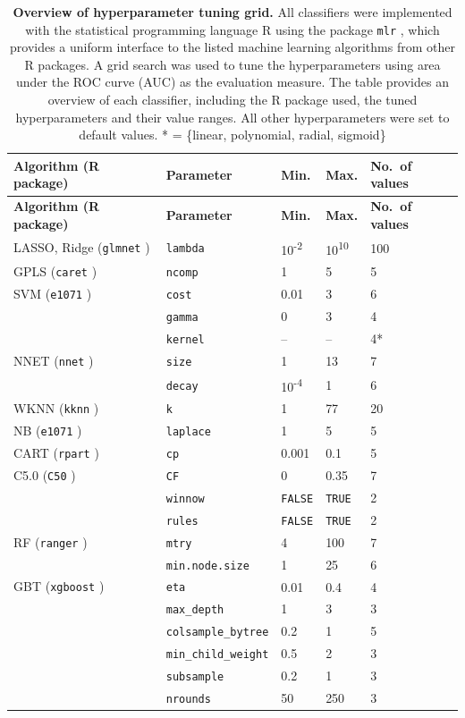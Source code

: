\documentclass[
  oneside]{book}
\begin{document}
\begin{longtable}[]{@{}lllll@{}}
\caption{\label{tab:09-hyper-tab}\textbf{Overview of hyperparameter tuning grid.} All classifiers were implemented with the statistical programming language R \autocite{rlanguage} using the package \texttt{mlr} \autocite{Bischl:mlr2016}, which provides a uniform interface to the listed machine learning algorithms from other R packages. A grid search was used to tune the hyperparameters using area under the ROC curve (AUC) as the evaluation measure. The table provides an overview of each classifier, including the R package used, the tuned hyperparameters and their value ranges. All other hyperparameters were set to default values. * = \{linear, polynomial, radial, sigmoid\}}\tabularnewline
\toprule
\textbf{Algorithm (R package)} & \textbf{Parameter} & \textbf{Min.} & \textbf{Max.} & \textbf{No.~of values}\tabularnewline
\midrule
\endfirsthead
\toprule
\textbf{Algorithm (R package)} & \textbf{Parameter} & \textbf{Min.} & \textbf{Max.} & \textbf{No.~of values}\tabularnewline
\midrule
\endhead
LASSO, Ridge (\texttt{glmnet} \autocite{lasso}) & \texttt{lambda} & 10\textsuperscript{-2} & 10\textsuperscript{10} & 100\tabularnewline
GPLS (\texttt{caret} \autocite{caret}) & \texttt{ncomp} & 1 & 5 & 5\tabularnewline
SVM (\texttt{e1071} \autocite{e1071}) & \texttt{cost} & 0.01 & 3 & 6\tabularnewline
& \texttt{gamma} & 0 & 3 & 4\tabularnewline
& \texttt{kernel} & -- & -- & 4*\tabularnewline
NNET (\texttt{nnet} \autocite{nnet}) & \texttt{size} & 1 & 13 & 7\tabularnewline
& \texttt{decay} & 10\textsuperscript{-4} & 1 & 6\tabularnewline
WKNN (\texttt{kknn} \autocite{Hechenbichler:wknn2004}) & \texttt{k} & 1 & 77 & 20\tabularnewline
NB (\texttt{e1071} \autocite{e1071}) & \texttt{laplace} & 1 & 5 & 5\tabularnewline
CART (\texttt{rpart} \autocite{rpart}) & \texttt{cp} & 0.001 & 0.1 & 5\tabularnewline
C5.0 (\texttt{C50} \autocite{c50}) & \texttt{CF} & 0 & 0.35 & 7\tabularnewline
& \texttt{winnow} & \texttt{FALSE} & \texttt{TRUE} & 2\tabularnewline
& \texttt{rules} & \texttt{FALSE} & \texttt{TRUE} & 2\tabularnewline
RF (\texttt{ranger} \autocite{ranger}) & \texttt{mtry} & 4 & 100 & 7\tabularnewline
& \texttt{min.node.size} & 1 & 25 & 6\tabularnewline
GBT (\texttt{xgboost} \autocite{xgboost}) & \texttt{eta} & 0.01 & 0.4 & 4\tabularnewline
& \texttt{max\_depth} & 1 & 3 & 3\tabularnewline
& \texttt{colsample\_bytree} & 0.2 & 1 & 5\tabularnewline
& \texttt{min\_child\_weight} & 0.5 & 2 & 3\tabularnewline
& \texttt{subsample} & 0.2 & 1 & 3\tabularnewline
& \texttt{nrounds} & 50 & 250 & 3\tabularnewline
\bottomrule
\end{longtable}
\end{document}
